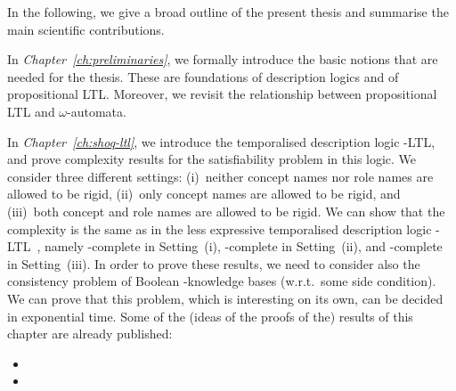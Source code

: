 In the following, we give a broad outline of the present thesis and summarise
the main scientific contributions.

In \emph{Chapter~\ref{ch:preliminaries}}, we formally introduce the basic
notions that are needed for the thesis.  These are foundations of description
logics and of propositional LTL\@.  Moreover, we revisit the relationship
between propositional LTL and $\omega$-automata.

In \emph{Chapter~\ref{ch:shoq-ltl}}, we introduce the temporalised description
logic \SHOQ-LTL, and prove complexity results for the satisfiability problem in
this logic.  We consider three different settings: (i)~neither concept names nor
role names are allowed to be rigid, (ii)~only concept names are allowed to be
rigid, and (iii)~both concept and role names are allowed to be rigid.  We can
show that the complexity is the same as in the less expressive temporalised
description logic \ALC-LTL~\cite{BaGL-ToCL12}, namely \ExpTime-complete in
Setting~(i), \NExpTime-complete in Setting~(ii), and \TwoExpTime-complete in
Setting~(iii).  In order to prove these results, we need to consider also the
consistency problem of Boolean \SHOQ-knowledge bases (w.r.t.\ some side
condition).  We can prove that this problem, which is interesting on its own,
can be decided in exponential time.
%
Some of the (ideas of the proofs of the) results of this chapter are already
published:
\begin{itemize}
    \item {}
    \item {}
\end{itemize}

